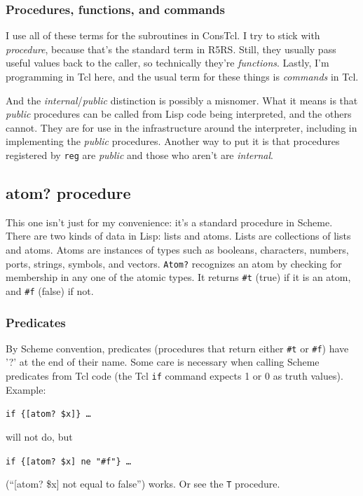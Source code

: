 \documentclass[twoside]{report}
\begin{document}
\begin{pulledtext}

\subsubsection{Procedures, functions, and commands}
\label{procedures-functions-and-commands}

I use all of these terms for the subroutines in ConsTcl. I try to stick with \emph{procedure}, because that's the standard term in R5RS. Still, they usually pass useful values back to the caller, so technically they're \emph{functions}. Lastly, I'm programming in Tcl here, and the usual term for these things is \emph{commands} in Tcl.

And the \emph{internal}/\emph{public} distinction is possibly a misnomer. What it means is that \emph{public} procedures can be called from Lisp code being interpreted, and the others cannot. They are for use in the infrastructure around the interpreter, including in implementing the \emph{public} procedures. Another way to put it is that procedures registered by \texttt{reg} are \emph{public} and those who aren't are \emph{internal}.
\end{pulledtext}

\subsection{atom? procedure}
\label{atom-procedure}

This one isn't just for my convenience: it's a standard procedure in Scheme. There are two kinds of data in Lisp: lists and atoms. Lists are collections of lists and atoms. Atoms are instances of types such as booleans, characters, numbers, ports, strings, symbols, and vectors. \texttt{Atom?} recognizes an atom by checking for membership in any one of the atomic types. It returns \texttt{\#t} (true) if it is an atom, and \texttt{\#f} (false) if not.

\begin{pulledtext}

\subsubsection{Predicates}
\label{predicates}

By Scheme convention, predicates (procedures that return either \texttt{\#t} or \texttt{\#f}) have '?' at the end of their name. Some care is necessary when calling Scheme predicates from Tcl code (the Tcl \texttt{if} command expects 1 or 0 as truth values). Example:

\texttt{if \{[atom? \$x]\} \ldots }

will not do, but

\texttt{if \{[atom? \$x] ne "\#f"\} \ldots }

(``[atom? \$x] not equal to false'') works. Or see the \texttt{T} procedure.
\end{pulledtext}
\end{document}
